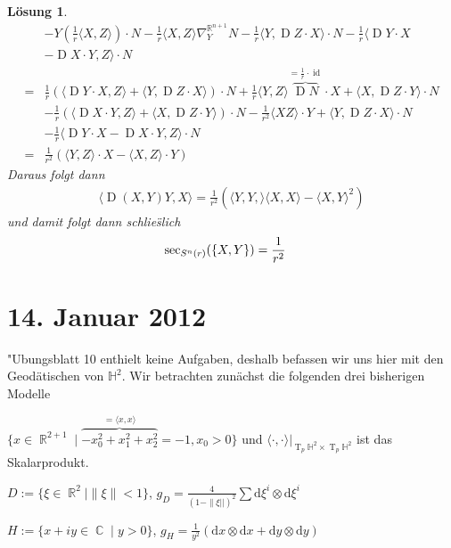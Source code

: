 \documentclass[paper=A4, twoside, chapterprefix=true, bibliography=totoc, headsepline]{scrbook}
\DeclareMathOperator{\C}{\mathbb{C}}
\DeclareMathOperator{\R}{\mathbb{R}}
\renewcommand{\H}{\ensuremath{\mathbb{H}}}
\DeclareMathOperator{\id}{id}       %
\DeclareMathOperator{\D}{D}         %
\DeclareMathOperator{\T}{T}         %
\newcommand{\dop}{\mathrm{d}}
\newcommand{\X}{\times}
\theoremstyle{plain}
\theoremstyle{nonumberplain}
\theoremstyle{empty}
\theoremstyle{break}
\newtheorem{Loes}{L\"osung}
\begin{document}
\begin{Loes}
\begin{align*}
		& - Y ( \frac{1}{r} \langle X, Z \rangle ) \cdot N - \frac{1}{r} \langle X, Z \rangle \nabla_Y^{\R^{n+1}} N - \frac{1}{r} \langle Y, \D Z \cdot X \rangle \cdot N - \frac{1}{r} \langle \D Y \cdot X\\
		& - \D X \cdot Y, Z \rangle \cdot N\\
	={}& \frac{1}{r} ( \langle \D Y \cdot X, Z \rangle + \langle Y, \D Z \cdot X \rangle ) \cdot N + \frac{1}{r} \langle Y, Z \rangle \overbrace{\D N}^{= \frac{1}{r} \cdot \id} \cdot X + \langle X, \D Z \cdot Y \rangle \cdot N\\
		& - \frac{1}{r} ( \langle \D X \cdot Y, Z \rangle + \langle X, \D Z \cdot Y \rangle ) \cdot N - \frac{1}{r^2} \langle X Z \rangle \cdot Y + \langle Y, \D Z \cdot X \rangle \cdot N\\
		& - \frac{1}{r} \langle \D Y \cdot X - \D X \cdot Y, Z \rangle \cdot N\\
	={}& \frac{1}{r^2} ( \langle Y, Z \rangle \cdot X - \langle X, Z \rangle \cdot Y)
\end{align*}
Daraus folgt dann
\begin{align*}
	\langle \D(X,Y) Y, X \rangle = \frac{1}{r^2} ( \langle Y, Y, \rangle \langle X, X \rangle - \langle X, Y \rangle^2)
\end{align*}
und damit folgt dann schlie\"slich
\begin{align*}
\sec_{S^n(r)}(\span\{X,Y\}) = \frac{1}{r^2}
\end{align*}
\end{Loes}


\section{14. Januar 2012}
\setcounter{Aufg}{0} %
\setcounter{Loes}{0}

"Ubungsblatt 10 enthielt keine Aufgaben, deshalb befassen wir uns hier mit den Geod\"atischen von $\H^2$.
Wir betrachten zun\"achst die folgenden drei bisherigen Modelle \begin{description}[leftmargin=*]
\item[Hyperboloid:]
	$\{ x \in \R^{2+1} \mid \overbrace{-x_0^2 + x_1^2 + x_2^2}^{= \langle x,x \rangle} = -1, x_0 > 0 \}$ und $\langle \cdot, \cdot \rangle|_{\T_p\H^2 \X \T_p\H^2}$ ist das Skalarprodukt.
\item[Poincare Kreisscheibenmodell:]
	$D := \{ \xi \in \R^2 \mid \|\xi\| < 1 \}$, $g_D = \frac{4}{(1 - \|\xi||)^2} \sum \dop \xi^{i} \otimes \dop \xi^{i}$
\item[Poincare obere Halbebene Modell:]
	$H := \{ x + iy \in \C \mid y > 0 \}$, $g_H = \frac{1}{y^2}(\dop x \otimes \dop x + \dop y \otimes \dop y)$
\end{description}
\end{document}
